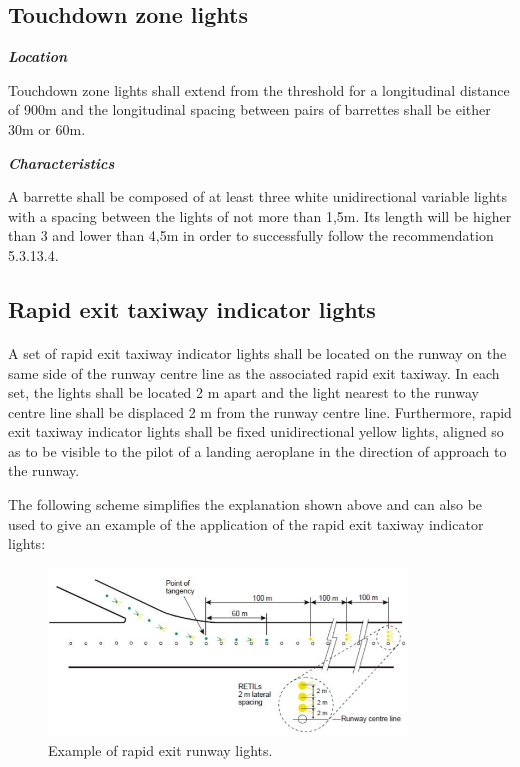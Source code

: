 		\subsection{Touchdown zone lights}
		\textbf{\textit{Location}}
		
		Touchdown zone lights shall extend from the threshold for a longitudinal distance of 900m and the longitudinal spacing between pairs of barrettes shall be either 30m or 60m.
		
		\textbf{\textit{Characteristics}}
		
		A barrette shall be composed of at least three white unidirectional variable lights with a spacing between the lights of not more than 1,5m. Its length will be higher than 3 and lower than 4,5m in order to successfully follow the recommendation 5.3.13.4.
			
		\subsection{Rapid exit taxiway indicator lights}
		\paragraph{}A set of rapid exit taxiway indicator lights shall be located on the runway on the same side of the runway centre line as the associated rapid exit taxiway. In each set, the lights shall be located 2 m apart and the light nearest to the runway centre line shall be displaced 2 m from the runway centre line. Furthermore, rapid exit taxiway indicator lights shall be fixed unidirectional yellow lights, aligned so as to be visible to the pilot of a landing aeroplane in the direction of approach to the runway. 
		
		The following scheme simplifies the explanation shown above and can also be used to give an example of the application of the rapid exit taxiway indicator lights:
		
		\begin{figure}[H]
			\centering
			\includegraphics[clip, trim=0cm 0cm 0cm 0cm, width=0.85\textwidth]{./images/Annex14/rapidexittaxiways}
			\caption{Example of rapid exit runway lights.} %
			\label{} %
		\end{figure}
	
